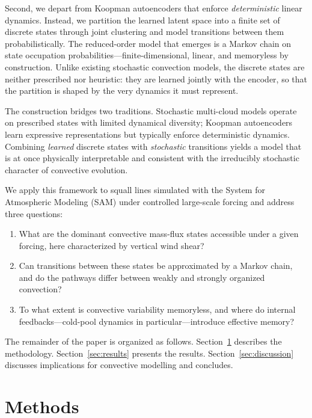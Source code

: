 \documentclass[11pt]{article}
\begin{document}
Second, we depart from Koopman autoencoders that enforce \emph{deterministic} linear dynamics. Instead, we partition the learned latent space into a finite set of discrete states through joint clustering \citep{kaiser2014cluster, souza2024representing} and model transitions between them probabilistically. The reduced-order model that emerges is a Markov chain on state occupation probabilities---finite-dimensional, linear, and memoryless by construction. Unlike existing stochastic convection models, the discrete states are neither prescribed nor heuristic: they are learned jointly with the encoder, so that the partition is shaped by the very dynamics it must represent.

The construction bridges two traditions. Stochastic multi-cloud models operate on prescribed states with limited dynamical diversity; Koopman autoencoders learn expressive representations but typically enforce deterministic dynamics. Combining \emph{learned} discrete states with \emph{stochastic} transitions yields a model that is at once physically interpretable and consistent with the irreducibly stochastic character of convective evolution.

We apply this framework to squall lines simulated with the System for Atmospheric Modeling (SAM) under controlled large-scale forcing and address three questions:
\begin{enumerate}
\item[(i)] What are the dominant convective mass-flux states accessible under a given forcing, here characterized by vertical wind shear?
\item[(ii)] Can transitions between these states be approximated by a Markov chain, and do the pathways differ between weakly and strongly organized convection?
\item[(iii)] To what extent is convective variability memoryless, and where do internal feedbacks---cold-pool dynamics in particular---introduce effective memory?
\end{enumerate}

The remainder of the paper is organized as follows. Section~\ref{sec:methods} describes the methodology. Section~\ref{sec:results} presents the results. Section~\ref{sec:discussion} discusses implications for convective modelling and concludes.

\section{Methods}\label{sec:methods}
\end{document}
